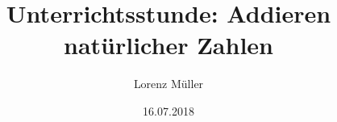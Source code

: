 %
% 
% 
%



\renewcommand{\Thema}{%
   Addieren natürlicher Zahlen}

\usepackage{amssymb} 




\title{Unterrichtsstunde: Addieren natürlicher Zahlen}
\author{Lorenz Müller}
\date{16.07.2018}




\tableofcontents %













\printbibliography
\clearpage

\listoffigures %

\printacronyms[title={Abkürzungsverzeichnis}] %

\listoftables %

\onehalfspacing
